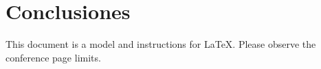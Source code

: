 \section{Conclusiones}
This document is a model and instructions for \LaTeX.
Please observe the conference page limits. 